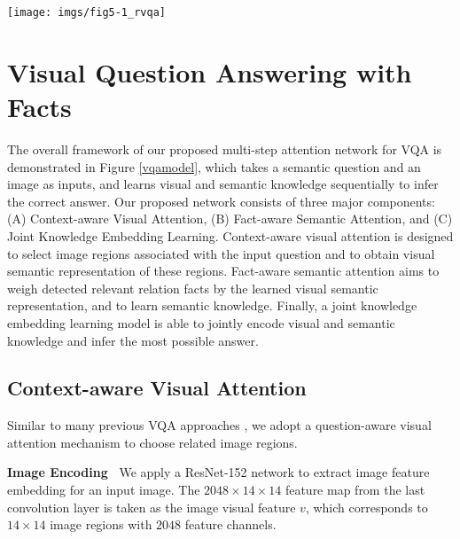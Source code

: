 \documentclass[sigconf]{acmart}
\begin{document}
\begin{figure*}[t]
	\centering
	\texttt{[image: imgs/fig5-1\_rvqa]}
	\caption{Our proposed multi-step attention network for VQA.}
	\label{vqamodel}
\end{figure*}















\section{Visual Question Answering with Facts}\label{section:vqa}


The overall framework of our proposed multi-step attention network for VQA is demonstrated in Figure \ref{vqamodel}, which takes a semantic question and an image as inputs, and learns visual and semantic knowledge sequentially to infer the correct answer. Our proposed network consists of three major components: (A) Context-aware Visual Attention, (B) Fact-aware Semantic Attention, and (C) Joint Knowledge Embedding Learning. Context-aware visual attention is designed to select image regions associated with the input question and to obtain visual semantic representation of these regions. Fact-aware semantic attention aims to weigh detected relevant relation facts by the learned visual semantic representation, and to learn semantic knowledge.
Finally, a joint knowledge embedding learning model is able to jointly encode visual and semantic knowledge and infer the most possible answer.



\subsection{Context-aware Visual Attention}\label{subsection:51} 

Similar to many previous VQA approaches \cite{fukui2016multimodal,xu2016ask,yu2017multi}, we adopt
a question-aware visual attention mechanism to choose related image regions. 

\textbf{Image Encoding~} We apply a ResNet-152 network \cite{he2016deep} to extract image feature embedding for an input image. The $2048\times14\times14$ feature map from the last convolution layer is taken as the image visual feature $v$, which corresponds to $14\times14$ image regions with $2048$ feature channels.
\end{document}
